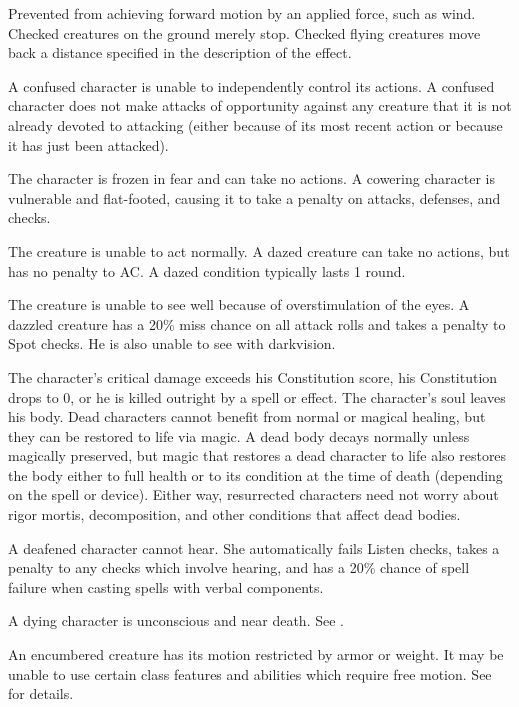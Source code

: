  Prevented from achieving forward motion by an applied force, such as wind. Checked creatures on the ground merely stop. Checked flying creatures move back a distance specified in the description of the effect.

\label{Confused} A confused character is unable to independently control its actions. \confusionexplanation A confused character does not make attacks of opportunity against any creature that it is not already devoted to attacking (either because of its most recent action or because it has just been attacked).

 The character is frozen in fear and can take no actions. A cowering character is vulnerable and flat-footed, causing it to take a  penalty on attacks, defenses, and checks.

 The creature is unable to act normally. A dazed creature can take no actions, but has no penalty to AC. A dazed condition typically lasts 1 round.

 The creature is unable to see well because of overstimulation of the eyes. A dazzled creature has a 20\% miss chance on all attack rolls and takes a  penalty to Spot checks. He is also unable to see with darkvision.

 The character's critical damage exceeds his Constitution score, his Constitution drops to 0, or he is killed outright by a spell or effect. The character's soul leaves his body. Dead characters cannot benefit from normal or magical healing, but they can be restored to life via magic. A dead body decays normally unless magically preserved, but magic that restores a dead character to life also restores the body either to full health or to its condition at the time of death (depending on the spell or device). Either way, resurrected characters need not worry about rigor mortis, decomposition, and other conditions that affect dead bodies.

 A deafened character cannot hear. She automatically fails Listen checks, takes a  penalty to any checks which involve hearing, and has a 20\% chance of spell failure when casting spells with verbal components.

 A dying character is unconscious and near death. See .

 An encumbered creature has its motion restricted by armor or weight. It may be unable to use certain class features and abilities which require free motion. See  for details.

